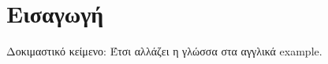 \chapter{Εισαγωγή} \label{introduction}
Δοκιμαστικό κείμενο: Έτσι αλλάζει η γλώσσα στα αγγλικά \textlatin{example}.
